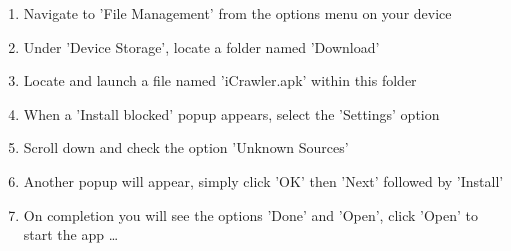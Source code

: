 \documentclass[hidelinks, 12pt, oneside]{article}
\begin{document}
	 \begin{enumerate}
 	 	\item Navigate to 'File Management' from the options menu on your device
 	 	\item Under 'Device Storage', locate a folder named 'Download'
 	 	\item Locate and launch a file named 'iCrawler.apk' within this folder
 	 	\item When a 'Install blocked' popup appears, select the 'Settings' option
 	 	\item Scroll down and check the option 'Unknown Sources'
 	 	\item Another popup will appear, simply click 'OK' then 'Next' followed by 'Install'
 	 	\item On completion you will see the options 'Done' and 'Open', click 'Open' to start the app \ldots
 	\end{enumerate}\newpage
\end{document}
